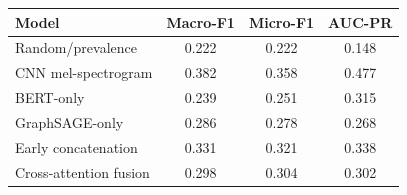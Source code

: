 \begin{tabular}{lccc}
\toprule
Model & Macro-F1 & Micro-F1 & AUC-PR \\
\midrule
Random/prevalence & 0.222 & 0.222 & 0.148 \\
CNN mel-spectrogram & 0.382 & 0.358 & 0.477 \\
BERT-only & 0.239 & 0.251 & 0.315 \\
GraphSAGE-only & 0.286 & 0.278 & 0.268 \\
Early concatenation & 0.331 & 0.321 & 0.338 \\
Cross-attention fusion & 0.298 & 0.304 & 0.302 \\
\bottomrule
\end{tabular}
